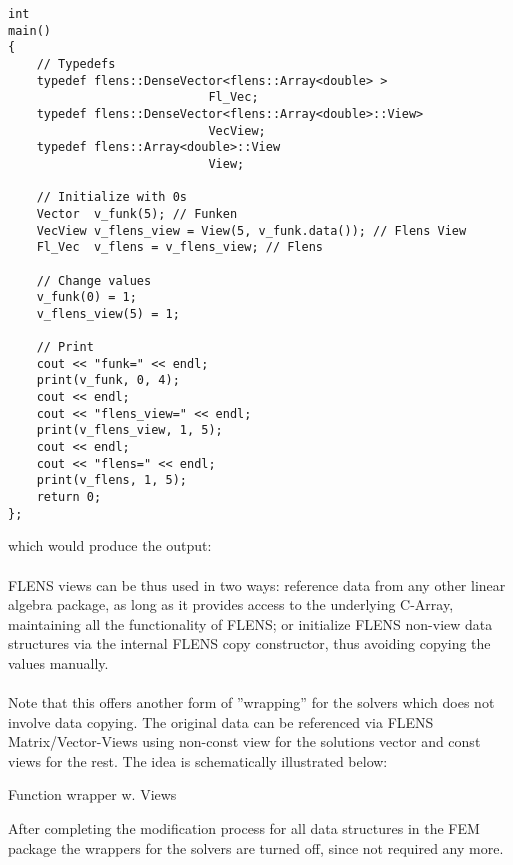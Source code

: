 \begin{lstlisting}
int
main()
{
	// Typedefs
	typedef flens::DenseVector<flens::Array<double> >
							Fl_Vec;
	typedef flens::DenseVector<flens::Array<double>::View>
							VecView;
	typedef flens::Array<double>::View
							View;
	
	// Initialize with 0s
	Vector 	v_funk(5); // Funken
	VecView v_flens_view = View(5, v_funk.data()); // Flens View
	Fl_Vec	v_flens = v_flens_view; // Flens

	// Change values
	v_funk(0) = 1;
	v_flens_view(5) = 1;

	// Print
	cout << "funk=" << endl;
	print(v_funk, 0, 4);
	cout << endl;
	cout << "flens_view=" << endl;
	print(v_flens_view, 1, 5);
	cout << endl;
	cout << "flens=" << endl;
	print(v_flens, 1, 5);
	return 0;
};
\end{lstlisting}
which would produce the output:
\\\\
FLENS views can be thus used in two ways: reference data from any other linear algebra package, as long as it provides access to the underlying C-Array, maintaining all the functionality of FLENS; or initialize FLENS non-view data structures via the internal FLENS copy constructor, thus avoiding copying the values manually.\\\\
Note that this offers another form of ''wrapping'' for the solvers which does not involve data copying. The original data can be referenced via FLENS Matrix/Vector-Views using non-const view for the solutions vector and const views for the rest. The idea is schematically illustrated below:
\begin{center}

\center
Function wrapper w. Views
\end{center}

After completing the modification process for all data structures in the FEM package the wrappers for the solvers are turned off, since not required any more.

